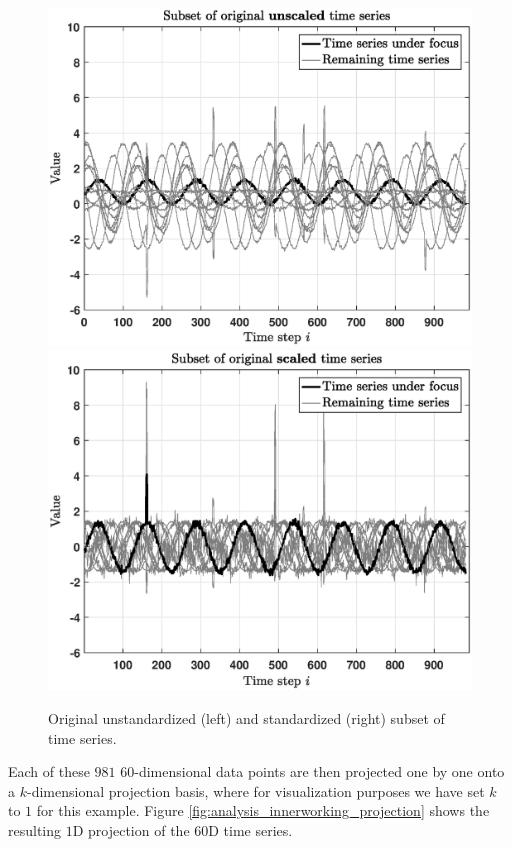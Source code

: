 \begin{figure}[h]
	\centering
	\vspace{-0.12cm}
	\includegraphics[scale=0.345]{analysis/Analysis_unscaled_original}
	\includegraphics[scale=0.345]{analysis/Analysis_scaled_original}
	\vspace{-0.12cm}
	\caption{Original unstandardized (left) and standardized (right) subset of time series.}
	\label{fig:analysis_innerworking_original}
	\vspace{-0.1cm}
\end{figure}

Each of these $981$ $60$-dimensional data points are then projected one by one onto a $k$-dimensional projection basis, where for visualization purposes we have set $k$ to $1$ for this example. Figure \ref{fig:analysis_innerworking_projection} shows the resulting $1$D projection of the $60$D time series. 

